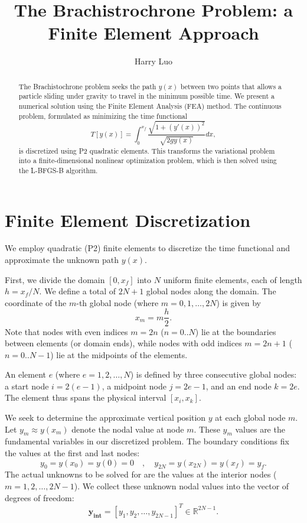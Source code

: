 \documentclass[12pt]{article}
\title{The Brachistrochrone Problem: a Finite Element Approach}
\author{Harry Luo}
\begin{document}
\maketitle
\begin{abstract}
    The Brachistochrone problem seeks the path \(y(x)\) between two points that allows a particle sliding under gravity to travel in the minimum possible time. We present a numerical solution using the Finite Element Analysis (FEA) method. The continuous problem, formulated as minimizing the time functional \[ T[y(x)] = \int_0^{x_f} \frac{\sqrt{1 + (y'(x))^2}}{\sqrt{2gy(x)}} dx, \] is discretized using P2 quadratic elements. This transforms the variational problem into a finite-dimensional nonlinear optimization problem, which is then solved using the L-BFGS-B algorithm.
\end{abstract}
    
\section{Finite Element Discretization}
    
    We employ quadratic (P2) finite elements to discretize the time functional and approximate the unknown path \(y(x)\).
    
    First, we divide the domain \( \left[0, x_f\right] \) into \(N \) uniform finite elements, each of length \( h = x_f / N \). We define a total of \(2N+1\) global nodes along the domain. The coordinate of the \(m\)-th global node (where \(m = 0, 1, \ldots, 2N\)) is given by
    \[ x_m = m \frac{h}{2}. \]
    Note that nodes with even indices \(m=2n\) ($n=0..N$) lie at the boundaries between elements (or domain ends), while nodes with odd indices \(m=2n+1\) ($n=0..N-1$) lie at the midpoints of the elements.
    
    An element \(e\) (where \(e = 1, 2, \ldots, N\)) is defined by three consecutive global nodes: a start node \(i = 2(e-1)\), a midpoint node \(j = 2e-1\), and an end node \(k = 2e\). The element thus spans the physical interval \( [x_i, x_k] \).
    
    We seek to determine the approximate vertical position \( y \) at each global node \(m\). Let \( y_m \approx y(x_m) \) denote the nodal value at node \(m\). These \( y_m \) values are the fundamental variables in our discretized problem. The boundary conditions fix the values at the first and last nodes:
    \[ y_{0} = y(x_{0}) = y(0) = 0 \quad , \quad y_{2N} = y(x_{2N}) = y(x_f) = y_f. \]
    The actual unknowns to be solved for are the values at the interior nodes ($m = 1, 2, \ldots, 2N-1$). We collect these unknown nodal values into the vector of degrees of freedom:
    \[ \mathbf{y_\text{int}} = \left[ y_1, y_2, \ldots, y_{2N-1} \right]^T \in \mathbb{R}^{2N-1}. \]
    
\end{document}
